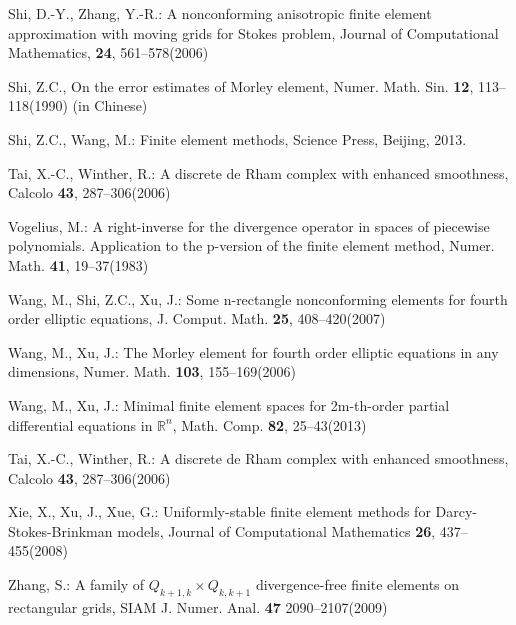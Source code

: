 \documentclass[12pt,showkeys]{amsart}
\begin{document}
\begin{thebibliography}{000}
\newblock Shi, D.-Y., Zhang, Y.-R.:
\rm{A nonconforming anisotropic finite element approximation with moving grids for Stokes problem}, Journal of Computational Mathematics, \textbf{24}, 561--578(2006)

\newblock Shi, Z.C.,
\rm{On the error estimates of Morley element}, Numer. Math. Sin. \textbf{12}, 113--118(1990) (in Chinese)

\newblock Shi, Z.C., Wang, M.: 
\rm{Finite element methods}, Science Press, Beijing, 2013.

\newblock Tai, X.-C., Winther, R.: 
\rm{A discrete de Rham complex with enhanced smoothness}, Calcolo \textbf{43}, 287--306(2006)

\newblock Vogelius, M.: 
\rm{A right-inverse for the divergence operator in spaces of piecewise polynomials. Application to the p-version of the finite element method}, Numer. Math. \textbf{41}, 19--37(1983)

\newblock Wang, M., Shi, Z.C., Xu, J.:
\rm{Some n-rectangle nonconforming elements for fourth order elliptic equations}, J. Comput. Math. \textbf{25}, 408--420(2007)

\newblock Wang, M., Xu, J.:
\rm{The Morley element for fourth order elliptic equations in any dimensions}, Numer. Math. \textbf{103}, 155--169(2006)

Wang, M., Xu, J.:
\rm{Minimal finite element spaces for 2m-th-order partial differential equations in $\mathbb{R}^n$}, Math. Comp. \textbf{82}, 25--43(2013)

\newblock Tai, X.-C., Winther, R.: 
\rm{A discrete de Rham complex with enhanced smoothness}, Calcolo \textbf{43}, 287--306(2006)

\newblock Xie, X., Xu, J., Xue, G.:
\rm{Uniformly-stable finite element methods for Darcy-Stokes-Brinkman models}, Journal of Computational Mathematics \textbf{26}, 437--455(2008)

\newblock Zhang, S.:
\rm{A family of $Q_{k+1,k}\times Q_{k,k+1}$ divergence-free finite elements on rectangular grids}, SIAM J. Numer. Anal. \textbf{47} 2090--2107(2009)

\end{thebibliography}
\end{document}
